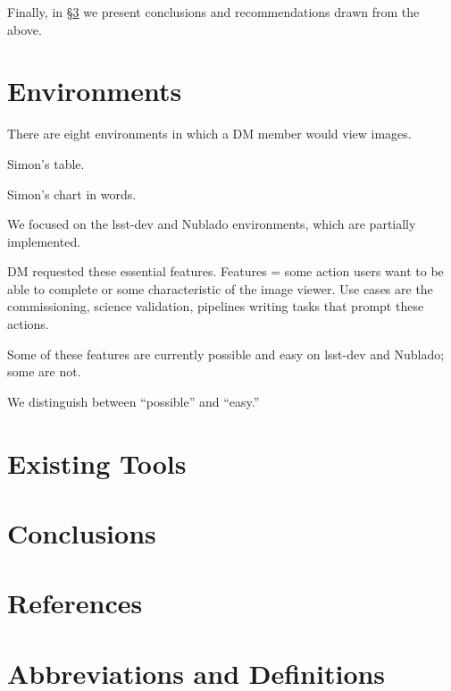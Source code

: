 \documentclass[DM,authoryear,toc]{lsstdoc}
\begin{document}
Finally, in \S\ref{sec:conc} we present conclusions and recommendations drawn from the above.

\section{Environments}
\label{sec:env}

There are eight environments in which a DM member would view images.

Simon's table.

Simon's chart in words.

We focused on the lsst-dev and Nublado environments, which are partially implemented.

DM requested these essential features.
Features = some action users want to be able to complete or some characteristic of the image viewer.
Use cases are the commissioning,  science validation, pipelines writing tasks that prompt these actions.

Some of these features are currently possible and easy on lsst-dev and Nublado; some are not.

We distinguish between ``possible'' and ``easy.''



\section{Existing Tools}
\label{sec:tools}

\section{Conclusions}
\label{sec:conc}

\appendix

\section{References}
\label{sec:bib}


\section{Abbreviations and Definitions}
\label{sec:acronyms}

\end{document}

